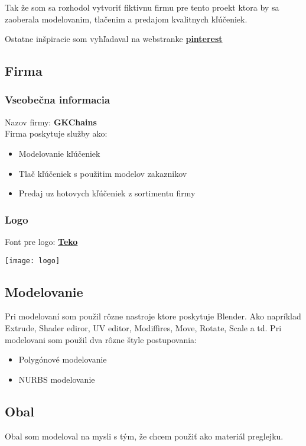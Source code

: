       Tak že som sa rozhodol vytvoriť fiktivnu firmu pre tento proekt ktora by sa zaoberala modelovanim, tlačenim a predajom kvalitnych kľúčeniek.

      Ostatne inšpiracie som vyhľadaval na webstranke \textbf{\href{https://pinterest.com}{pinterest}}

    \subsection{Firma}
      \subsubsection{Vseobečna informacia}
      Nazov firmy: \textbf{GKChains} \\
      Firma poskytuje služby ako:
      \begin{itemize}
        \item{Modelovanie kľúčeniek}
        \item{Tlač kľúčeniek s použitim modelov zakaznikov}
        \item{Predaj uz hotovych kľúčeniek z sortimentu firmy}
      \end{itemize}
      \subsubsection{Logo}
      Font pre logo: \textbf{\href{https://fonts.google.com/specimen/Teko?query=Teko}{Teko}}

      \begin{center}
        \texttt{[image: logo]}
      \end{center}

    \subsection{Modelovanie}
      Pri modelovaní som použil rôzne nastroje ktore poskytuje Blender. Ako napríklad Extrude, Shader ediror, UV editor, Modiffires, Move, Rotate, Scale a td. Pri modelovani som použil dva rôzne štyle postupovania:
      \begin{itemize}
        \item{Polygónové modelovanie}
        \item{NURBS modelovanie}
      \end{itemize}

      \subsection{Obal}
        Obal som modeloval na mysli s tým, že chcem použiť ako materiál preglejku.

